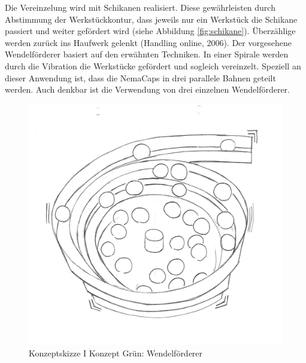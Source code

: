 Die Vereinzelung wird mit Schikanen realisiert. Diese gewährleisten durch Abstimmung der Werkstückkontur, dass jeweils nur ein Werkstück die Schikane passiert und weiter gefördert wird (siehe Abbildung \ref{fig:schikane}). Überzählige werden zurück ins Haufwerk gelenkt (Handling online, 2006).
\newline
Der vorgesehene Wendelförderer basiert auf den erwähnten Techniken. In einer Spirale werden durch die Vibration die Werkstücke gefördert und sogleich vereinzelt. Speziell an dieser Anwendung ist, dass die NemaCaps in drei parallele Bahnen geteilt werden. Auch denkbar ist die Verwendung von drei einzelnen Wendelförderer.
\newline
\begin{figure}[H]
	\includegraphics[scale=0.6]{Illustrationen/5-Konzept/green_wendelfoerderer.jpg}
	\caption{Konzeptskizze I Konzept Grün: Wendelförderer}
	\label{fig:vereinzelung_green}
\end{figure}

